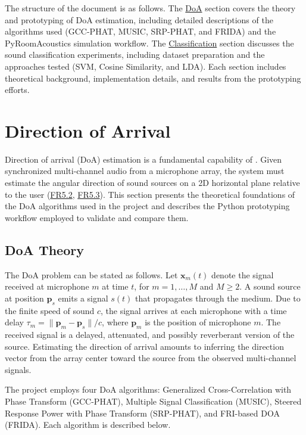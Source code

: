 \documentclass[12pt, titlepage]{article}
\begin{document}
The structure of the document is as follows. The \hyperref[sec:doa]{DoA} section
covers the 
theory and prototyping of DoA estimation, including detailed descriptions of 
the algorithms used (GCC-PHAT, MUSIC, SRP-PHAT, and FRIDA) and the 
PyRoomAcoustics simulation workflow. The
\hyperref[sec:classification]{Classification} section discusses 
the sound classification experiments, including dataset preparation and the 
approaches tested (SVM, Cosine Similarity, and LDA). Each section includes 
theoretical background, implementation details, and results from the 
prototyping efforts. 

\section{Direction of Arrival} \label{sec:doa}

Direction of arrival (DoA) estimation is a fundamental capability of \progname{}.
Given synchronized multi-channel audio from a microphone array, the system must
estimate the angular direction of sound sources on a 2D horizontal plane
relative to the user (\hyperref[SRS-FR5_2]{FR5.2}, \hyperref[SRS-FR5_3]{FR5.3}).
This section presents the theoretical foundations of the DoA algorithms used in
the project and describes the Python prototyping workflow employed to validate
and compare them.

\subsection{DoA Theory} \label{sec:doa_theory}

The DoA problem can be stated as follows. Let $\mathbf{x}_m(t)$ denote the
signal received at microphone $m$ at time $t$, for $m = 1, \ldots, M$ and $M
\geq 2$. A sound source at position $\mathbf{p}_s$ emits a signal $s(t)$ that
propagates through the medium. Due to the finite speed of sound $c$, the signal
arrives at each microphone with a time delay $\tau_m = \|\mathbf{p}_m -
\mathbf{p}_s\| / c$, where $\mathbf{p}_m$ is the position of microphone $m$.
The received signal is a delayed, attenuated, and possibly reverberant version
of the source. Estimating the direction of arrival amounts to inferring the
direction vector from the array center toward the source from the observed
multi-channel signals.

The project employs four DoA algorithms: Generalized Cross-Correlation with
Phase Transform (GCC-PHAT), Multiple Signal Classification (MUSIC), Steered
Response Power with Phase Transform (SRP-PHAT), and FRI-based DOA (FRIDA). Each
algorithm is described below.
\end{document}
